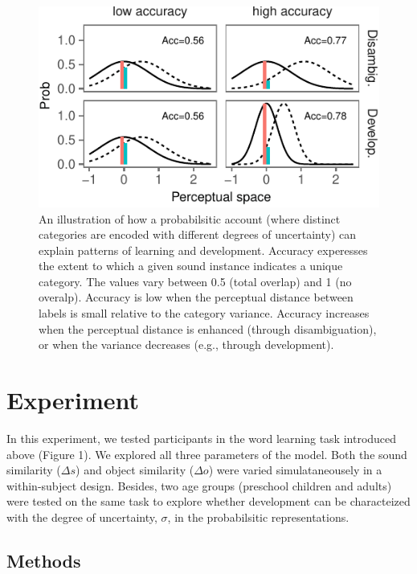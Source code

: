 \documentclass[10pt, letterpaper]{article}
\newenvironment{CodeChunk}{}{}
\begin{document}
\begin{CodeChunk}
\begin{figure}[H]

{\centering \includegraphics{figs/illus-1} 

}

\caption{\label{fig:illus} An illustration of how a probabilsitic account (where distinct categories are encoded with different degrees of uncertainty) can explain patterns of learning and development. Accuracy experesses the extent to which a given sound instance indicates a unique category. The values vary between 0.5 (total overlap) and 1 (no overalp). Accuracy is low when the perceptual distance between labels is small relative to the category variance. Accuracy increases when the perceptual distance is enhanced (through disambiguation), or when the variance decreases (e.g., through development).}\label{fig:illus}
\end{figure}
\end{CodeChunk}

\section{Experiment}\label{experiment}

In this experiment, we tested participants in the word learning task
introduced above (Figure 1). We explored all three parameters of the
model. Both the sound similarity (\(\Delta s\)) and object similarity
(\(\Delta o\)) were varied simulataneousely in a within-subject design.
Besides, two age groups (preschool children and adults) were tested on
the same task to explore whether development can be characteized with
the degree of uncertainty, \(\sigma\), in the probabilsitic
representations.

\subsection{Methods}\label{methods}
\end{document}
